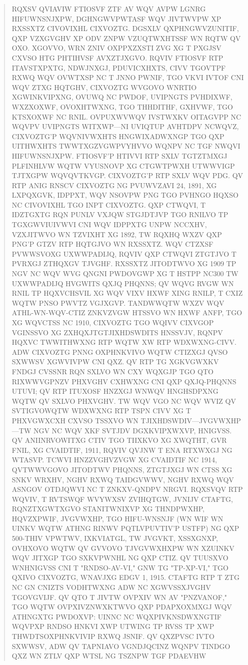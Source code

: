 \documentclass{labreport}
\begin{document}
\begin{quote}\footnotesize\ttfamily\raggedright
RQXSV QVIAVIW FTIOSVF ZTF AV WQV AVPW LGNRG HIFUWNSNJXPW, DGHNGWVPWTASF WQV JIVTWVPW XP RXSSXTZ CIVOVIXHL CIXVOZTG. DGSXLV QXPHNGWVZUNITIF, QXP VZXGVGHV XP ODV ZNPW VZUQTWXHTSSF WN RQTW QV OXO. XGOVVO, WRN ZNIV OXPPXZXSTI ZVG XG T PXGJSV CXVSO HTG PHTIHVSF AVXZTJXGVO. RQVIV FTIOSVF RTP ITAVSTXPXTG, NDWJNXGJ, PDUVICXHXTS, CIVV TGOVTPF RXWQ WQV OVWTXSP NC T JNNO PWNIF, TGO VKVI IVTOF CNI WQV ZTXG HQTGHV, CIXVOZTG WVGOVO WNRTIO XGWINKVIPXNG, OVUWQ NC PWDOF, UVIPNGTS PVHDIXWF, WXZXOXWF, OVOXHTWXNG, TGO THHDITHF, GXHVWF, TGO KTSXOXWF NC RNIL. OVPUXWVWQV IVSTWXKV OITAGVPP NC WQVPV UVIPNGTS WITXWP---NI UVIQTUP AVHTDPV NCWQVZ, CIXVOZTG'P WQVNIVWXHTS HNGWIXADWXNGP TGO QXP UITHWXHTS TWWTXGZVGWPVYHVVO WQNPV NC TGF NWQVI HIFUWNSNJXPW. FTIOSVF'P HTIVVI RTP SXLV TGTZTMXGJ PLFINHLVW WQTW VYUSNOVP XG CTGWTPWXH UTWWVIGP TJTXGPW WQVQVTKVGP. CIXVOZTG'P RTP SXLV WQV PDG. QV RTP ANIG RNSCV CIXVOZTG NG PVUWVZAVI 24, 1891, XG LXPQXGVK, IDPPXT, WQV NSOVPW PNG TGO PVHNGO HQXSO NC CIVOVIXHL TGO INPT CIXVOZTG. QXP CTWQVI, T IDZTGXTG RQN PUNLV VXJQW STGJDTJVP TGO RNILVO TP TGXGWVIUIVWVI CNI WQV IDPPXTG UNPW NCCXHV, VZXJITWVO WN TZVIXHT XG 1892, TW RQXHQ WXZV QXP PNG'P GTZV RTP HQTGJVO WN RXSSXTZ. WQV CTZXSF PVWWSVOXG UXWWPADIJQ, RQVIV QXP CTWQVI ZTGTJVO T PVRXGJ ZTHQXGV TJVGHF. RXSSXTZ JITODTWVO XG 1909 TP NGV NC WQV WVG QNGNI PWDOVGWP XG T HSTPP NC300 TW UXWWPADIJQ HVGWITS QXJQ PHQNNS; QV WQVG RVGW WN RNIL TP HQXVCHSVIL XG WQV VIXV HXWF XING RNILP, T CXIZ WQTW PNSO PWVTZ VGJXGVP. TANDWWQTW WXZV WQV ATHL-WN-WQV-CTIZ ZNKVZVGW HTSSVO WN HXWF ANFP, TGO XG WQVCTSS NC 1910, CIXVOZTG TGO WQIVV CIXVGOP VGINSSVO XG ZXHQXJTGTJIXHDSWDITS HNSSVJV, RQNPV HQXVC TWWITHWXNG RTP WQTW XW RTP WDXWXNG-CIVV. ADW CIXVOZTG PNNG OXPHNKVIVO WQTW CTIZXGJ QVSO SXWWSV XGWVIVPW CNI QXZ. QV RTP TG XGKVGWXKV FNDGJ CVSSNR RQN SXLVO WN CXY WQXGJP TGO QTO RIXWWVGPNZV PHXVGHV CXHWXNG CNI QXP QXJQ-PHQNNS UTUVI; QV RTP ITUXOSF HNZXGJ WNWQV HNGHSDPXNG WQTW QV SXLVO PHXVGHV. TW WQV VGO NC WQV WVIZ QV SVTIGVOWQTW WDXWXNG RTP TSPN CIVV XG T PHXVGWXCXH CXVSO TSSXVO WN TJIXHDSWDIV---JVGVWXHP---TW NGV NC WQV XKF SVTJDV DGXKVIPXWXVP, HNIGVSS. QV ANIINRVOWITXG CTIV TGO TIIXKVO XG XWQTHT, GVR FNIL, XG CVAIDTIF, 1911, RQVIV QVJNW T ENA RTXWXGJ NG WTASVP. TCWVI HNZZVGHVZVGW XG CVAIDTIF NC 1914, QVTWWVGOVO JITODTWV PHQNNS, ZTGTJXGJ WN CTSS XG SNKV WRXHV, NGHV RXWQ TAIDGVWWV, NGHV RXWQ WQV ASNGOV OTDJQWVI NC T ZNKXV-QNDPV NRGVI. RQXSVQV RTP WQVIV, T RVTSWQF WVYWXSV ZVIHQTGW, JVNIJV CTAFTG, RQNZTXGWTXGVO STANITWNIXVP XG THNDPWXHP, HQVZXPWIF, JVGVWXHP, TGO HIFU-WNSNJF (WN WIF WN UINKV WQTW ATHNG RINWV PQTLVPUVTIV'P USTFP) NG QXP 500-THIV VPWTWV, IXKVIATGL, TW JVGVKT, XSSXGNXP, OVHXOVO WQTW QV GVVOVO TJVGVWXHXPW WN XZUINKV WQV JITXGP TGO SXKVPWNHL NG QXP CTIZ. QV TUUSXVO WNHNIGVSS CNI T "RNDSO-AV-VI," GNW TG "TP-XP-VI," TGO QXIVO CIXVOZTG, WNAVJXG EDGV 1, 1915. CTAFTG RTP T ZTG NC GN CNIZTS VODHTWXNG ADW NC XGWVSSXJVGHV TGOVGVIJF. QV QTO T JIVTW OVPXIV WN AV "PNZVANOF," TGO WQTW OVPXIVZNWXKTWVO QXP PDAPXOXMXGJ WQV ATHNGXTG PWDOXVP: UINNC NC WQXPIVKNSDWXNGTIF WQVPXP RNDSO HNKVI XWP UTWING TP RVSS TP XWP THWDTSOXPHNKVIVIP RXWQ JSNIF. QV QXZPVSC IVTO SXWWSV, ADW QV TAPNIAVO VGNDJQCINZ WQNPV TINDGO QXZ WN ZTLV QXP WTSL NG TSZNPW TGF PDAEVHW 
\end{quote}
\end{document}
